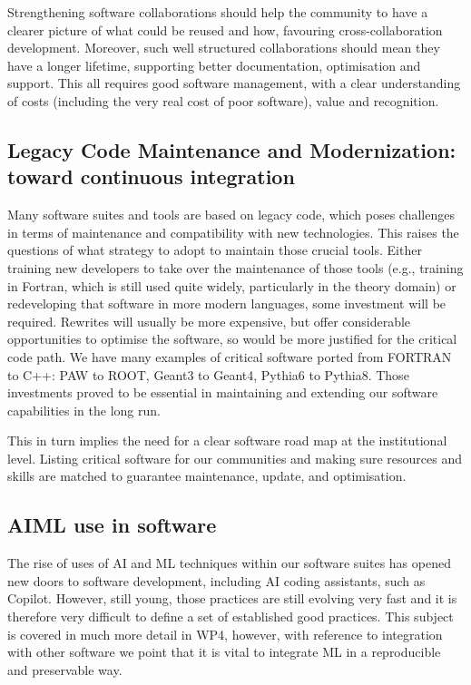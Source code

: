 Strengthening software collaborations should help the community to have a clearer picture of what could be reused and how, favouring cross-collaboration development. Moreover, such well structured collaborations should mean they have a longer lifetime, supporting better documentation, optimisation and support. This all requires good software management, with a clear understanding of costs (including the very real cost of poor software), value and recognition.


\subsection{Legacy Code Maintenance and Modernization: toward continuous integration}

Many software suites and tools are based on legacy code, which poses challenges in terms of maintenance and compatibility with new technologies. This raises the questions of what strategy to adopt to maintain those crucial tools. Either training new developers to take over the maintenance of those tools (e.g., training in Fortran, which is still used quite widely, particularly in the theory domain) or redeveloping that software in more modern languages, some investment will be required. Rewrites will usually be more expensive, but offer considerable opportunities to optimise the software, so would be more justified for the critical code path. We have many examples of critical software ported from FORTRAN to C++: PAW to ROOT, Geant3 to Geant4, Pythia6 to Pythia8. Those investments proved to be essential in maintaining and extending our software capabilities in the long run.

This in turn implies the need for a clear software road map at the institutional level. Listing critical software for our communities and making sure resources and skills are matched to guarantee maintenance, update, and optimisation.

\subsection{AI\/ML use in software}

The rise of uses of AI and ML techniques within our software suites has opened new doors to software development, including AI coding assistants, such as Copilot. However, still young, those practices are still evolving very fast and it is therefore very difficult to define a set of established good practices. This subject is covered in much more detail in WP4, however, with reference to integration with other software we point that it is vital to integrate ML in a reproducible and preservable way.

